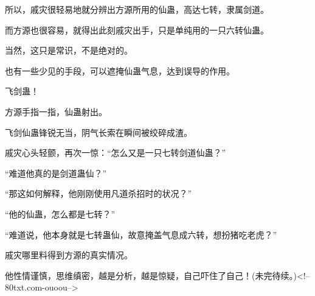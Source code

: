 \begin{this_body}
所以，戚灾很轻易地就分辨出方源所用的仙蛊，高达七转，隶属剑道。

而方源也很容易，就得出此刻戚灾出手，只是单纯用的一只六转仙蛊。

当然，这只是常识，不是绝对的。

也有一些少见的手段，可以遮掩仙蛊气息，达到误导的作用。

飞剑蛊！

方源手指一指，仙蛊射出。

飞剑仙蛊锋锐无当，阴气长索在瞬间被绞碎成渣。

戚灾心头轻颤，再次一惊：“怎么又是一只七转剑道仙蛊？”

“难道他真的是剑道蛊仙？”

“那这如何解释，他刚刚使用凡道杀招时的状况？”

“他的仙蛊，怎么都是七转？”

“难道说，他本身就是七转蛊仙，故意掩盖气息成六转，想扮猪吃老虎？”

戚灾哪里料得到方源的真实情况。

他性情谨慎，思维缜密，越是分析，越是惊疑，自己吓住了自己！(未完待续。)<!--80txt.com-ouoou-->

\end{this_body}

